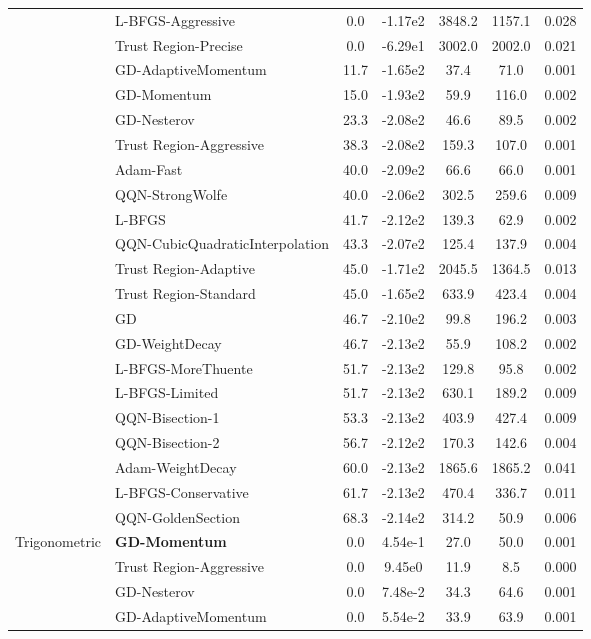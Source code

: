 \documentclass{article}
\begin{document}
\begin{table}[htbp]
{\begin{tabular}{p{2.5cm}p{2.5cm}*{5}{c}}
 & L-BFGS-Aggressive & 0.0 & -1.17e2 & 3848.2 & 1157.1 & 0.028 \\
 & Trust Region-Precise & 0.0 & -6.29e1 & 3002.0 & 2002.0 & 0.021 \\
 & GD-AdaptiveMomentum & 11.7 & -1.65e2 & 37.4 & 71.0 & 0.001 \\
 & GD-Momentum & 15.0 & -1.93e2 & 59.9 & 116.0 & 0.002 \\
 & GD-Nesterov & 23.3 & -2.08e2 & 46.6 & 89.5 & 0.002 \\
 & Trust Region-Aggressive & 38.3 & -2.08e2 & 159.3 & 107.0 & 0.001 \\
 & Adam-Fast & 40.0 & -2.09e2 & 66.6 & 66.0 & 0.001 \\
 & QQN-StrongWolfe & 40.0 & -2.06e2 & 302.5 & 259.6 & 0.009 \\
 & L-BFGS & 41.7 & -2.12e2 & 139.3 & 62.9 & 0.002 \\
 & QQN-CubicQuadraticInterpolation & 43.3 & -2.07e2 & 125.4 & 137.9 & 0.004 \\
 & Trust Region-Adaptive & 45.0 & -1.71e2 & 2045.5 & 1364.5 & 0.013 \\
 & Trust Region-Standard & 45.0 & -1.65e2 & 633.9 & 423.4 & 0.004 \\
 & GD & 46.7 & -2.10e2 & 99.8 & 196.2 & 0.003 \\
 & GD-WeightDecay & 46.7 & -2.13e2 & 55.9 & 108.2 & 0.002 \\
 & L-BFGS-MoreThuente & 51.7 & -2.13e2 & 129.8 & 95.8 & 0.002 \\
 & L-BFGS-Limited & 51.7 & -2.13e2 & 630.1 & 189.2 & 0.009 \\
 & QQN-Bisection-1 & 53.3 & -2.13e2 & 403.9 & 427.4 & 0.009 \\
 & QQN-Bisection-2 & 56.7 & -2.12e2 & 170.3 & 142.6 & 0.004 \\
 & Adam-WeightDecay & 60.0 & -2.13e2 & 1865.6 & 1865.2 & 0.041 \\
 & L-BFGS-Conservative & 61.7 & -2.13e2 & 470.4 & 336.7 & 0.011 \\
 & QQN-GoldenSection & 68.3 & -2.14e2 & 314.2 & 50.9 & 0.006 \\
\midrule
\multirow{25}{*}{Trigonometric} & \textbf{GD-Momentum} & 0.0 & 4.54e-1 & 27.0 & 50.0 & 0.001 \\
 & Trust Region-Aggressive & 0.0 & 9.45e0 & 11.9 & 8.5 & 0.000 \\
 & GD-Nesterov & 0.0 & 7.48e-2 & 34.3 & 64.6 & 0.001 \\
 & GD-AdaptiveMomentum & 0.0 & 5.54e-2 & 33.9 & 63.9 & 0.001 \\

\end{tabular}}
\end{table}
\end{document}
